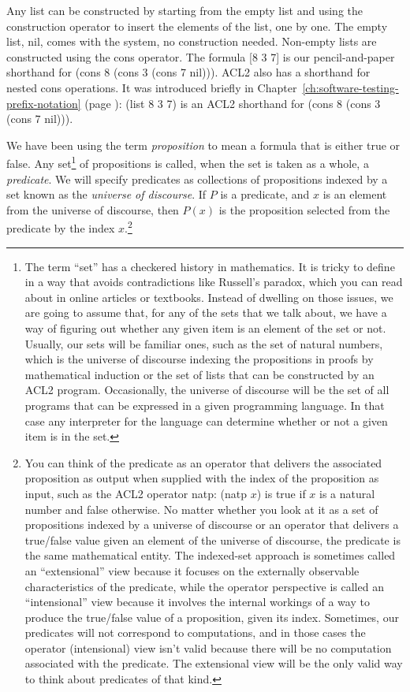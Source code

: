Any list can be constructed by starting from the empty list
and using the construction operator to insert the elements of the list, one by one.
The empty list, nil, comes with the system, no construction needed.
Non-empty lists are constructed using the cons operator.
The formula [8 3 7] is our pencil-and-paper shorthand for (cons 8 (cons 3 (cons 7 nil))).
ACL2 also has a shorthand for nested cons operations.
It was introduced briefly in
Chapter~\ref{ch:software-testing-prefix-notation} (page \pageref{list-op-informal}):
(list 8 3 7) is an ACL2 shorthand for (cons 8 (cons 3 (cons 7 nil))).

\label{proposition-def}
We have been using the term \emph{proposition} to mean a formula that is either true or false.
\label{predicate-def}
Any set\footnote{The
term ``set'' has a checkered history in mathematics.
It is tricky to define in a way that avoids contradictions
like Russell's paradox, which you can read about
in online articles or textbooks.
Instead of dwelling on those issues,
we are going to assume that,
for any of the sets that we talk about,
we have a way of figuring out whether any given
item is an element of the set or not.
Usually, our sets will be familiar ones,
such as the set of natural numbers, which
is the universe of discourse indexing the propositions
in proofs by mathematical induction or
the set of lists that can be constructed
by an ACL2 program.
Occasionally, the universe of discourse will be
the set of all programs that can be expressed in a given
programming language.
In that case
any interpreter for the language
can determine whether or
not a given item is in the set.}
of propositions is called,
when the set is taken as a whole, a \emph{predicate}.
We will specify predicates as collections of propositions
indexed by a set known as the
\label{def-universe-of-discourse}
\emph{universe of discourse}.
If $P$ is a predicate, and $x$ is an element from
the universe of discourse, then $P(x)$ is
the proposition selected from the predicate by the index $x$.\footnote{You
can think of the predicate as an
operator that delivers the associated proposition as output
when supplied with the index of the proposition as input,
such as the ACL2 operator natp: (natp $x$) is true if
$x$ is a natural number and false otherwise.
No matter whether you look at it as a set of propositions
indexed by a universe of discourse or an operator that
delivers a true/false value given an element of the universe of discourse,
the predicate is the same mathematical entity.
The indexed-set approach is sometimes called an ``extensional'' view
because it focuses on the externally observable characteristics of the predicate,
while the operator perspective is called an ``intensional'' view because it
involves the internal workings of a way to produce the true/false value
of a proposition, given its index.
Sometimes, our predicates will not correspond to computations,
and in those cases the operator (intensional) view
isn't valid because there will be no
computation associated with the predicate.
The extensional view will be the only valid way
to think about predicates of that kind.}

